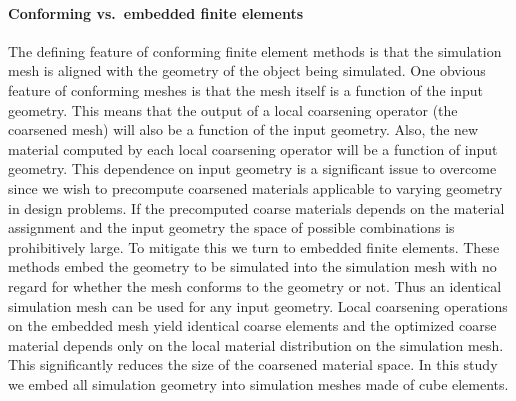 \paragraph{Conforming vs.~embedded finite elements}
The defining feature of conforming finite element methods is that the simulation mesh is aligned with the geometry of the object being simulated. One obvious feature of conforming meshes is that the mesh itself is a function of the input geometry. This means that the output of a local coarsening operator (the coarsened mesh) will also be a function of the input geometry. Also, the new material computed by each local coarsening operator will be a function of input geometry. This dependence on input geometry is a significant issue to overcome since we wish to precompute coarsened materials applicable to varying geometry in design problems. If the precomputed coarse materials depends on the material assignment and the input geometry the space of possible combinations is prohibitively large.
To mitigate this we turn to embedded finite elements. These methods embed the geometry to be simulated into the simulation mesh with no regard for whether the mesh conforms to the geometry or not. Thus an identical simulation mesh can be used for any input geometry. Local coarsening operations on the embedded mesh yield identical coarse elements and the optimized coarse material depends only on the local material distribution on the simulation mesh.  This significantly reduces the size of the coarsened material space. In this study we embed all simulation geometry into simulation meshes made of cube elements.

